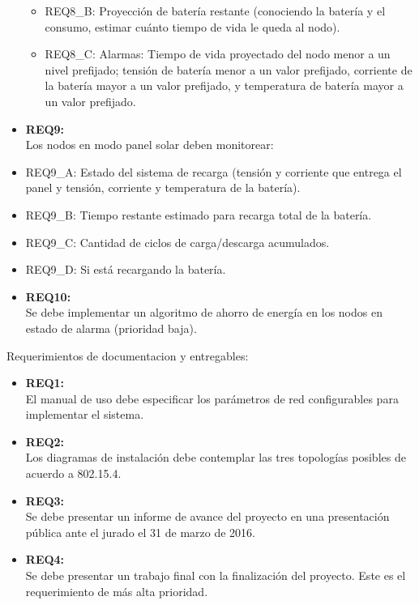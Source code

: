 \begin{itemize}
\begin{itemize}
		\item REQ8\_B: Proyección de batería restante (conociendo la batería y el consumo, estimar cuánto tiempo de vida le queda al nodo).
		\item REQ8\_C: Alarmas: Tiempo de vida proyectado del nodo menor a un nivel prefijado; tensión de batería menor a un valor prefijado, corriente de la batería mayor a un valor prefijado, y temperatura de batería mayor a un valor prefijado.
		\end{itemize}
	\item \textbf{REQ9:}\\Los nodos en modo panel solar deben monitorear:
		\item REQ9\_A: Estado del sistema de recarga (tensión y corriente que entrega el panel y tensión, corriente y temperatura de la batería).
		\item REQ9\_B: Tiempo restante estimado para recarga total de la batería.
		\item REQ9\_C: Cantidad de ciclos de carga/descarga acumulados.
		\item REQ9\_D: Si está recargando la batería.
	\item \textbf{REQ10:}\\Se debe implementar un algoritmo de ahorro de energía en los nodos en estado de alarma (prioridad baja).
\end{itemize}

\noindent Requerimientos de documentacion y entregables:
\begin{itemize}
	\item \textbf{REQ1:}\\ El manual de uso debe especificar los parámetros de red configurables para implementar el sistema.
	\item \textbf{REQ2:}\\ Los diagramas de instalación debe contemplar las tres topologías posibles de acuerdo a 802.15.4.
	\item \textbf{REQ3:}\\ Se debe presentar un informe de avance del proyecto en una presentación pública ante el jurado el 31 de marzo de 2016.
	\item \textbf{REQ4:}\\ Se debe presentar un trabajo final con la finalización del proyecto. Este es el requerimiento de más alta prioridad.	
\end{itemize}


